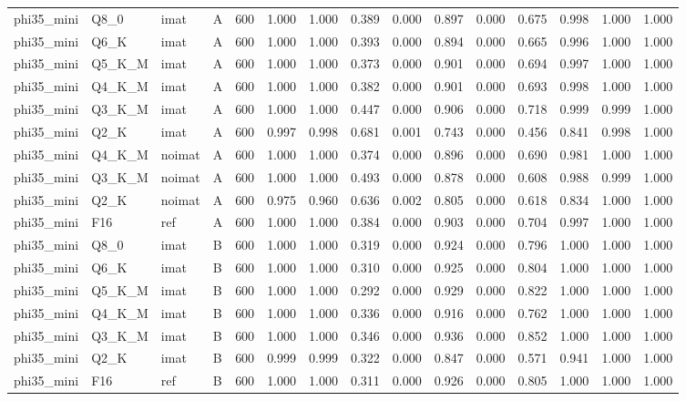 \begin{tabular}{llllrrrrrrrrrrr}
phi35\_mini & Q8\_0 & imat & A & 600 & 1.000 & 1.000 & 0.389 & 0.000 & 0.897 & 0.000 & 0.675 & 0.998 & 1.000 & 1.000 \\
phi35\_mini & Q6\_K & imat & A & 600 & 1.000 & 1.000 & 0.393 & 0.000 & 0.894 & 0.000 & 0.665 & 0.996 & 1.000 & 1.000 \\
phi35\_mini & Q5\_K\_M & imat & A & 600 & 1.000 & 1.000 & 0.373 & 0.000 & 0.901 & 0.000 & 0.694 & 0.997 & 1.000 & 1.000 \\
phi35\_mini & Q4\_K\_M & imat & A & 600 & 1.000 & 1.000 & 0.382 & 0.000 & 0.901 & 0.000 & 0.693 & 0.998 & 1.000 & 1.000 \\
phi35\_mini & Q3\_K\_M & imat & A & 600 & 1.000 & 1.000 & 0.447 & 0.000 & 0.906 & 0.000 & 0.718 & 0.999 & 0.999 & 1.000 \\
phi35\_mini & Q2\_K & imat & A & 600 & 0.997 & 0.998 & 0.681 & 0.001 & 0.743 & 0.000 & 0.456 & 0.841 & 0.998 & 1.000 \\
phi35\_mini & Q4\_K\_M & noimat & A & 600 & 1.000 & 1.000 & 0.374 & 0.000 & 0.896 & 0.000 & 0.690 & 0.981 & 1.000 & 1.000 \\
phi35\_mini & Q3\_K\_M & noimat & A & 600 & 1.000 & 1.000 & 0.493 & 0.000 & 0.878 & 0.000 & 0.608 & 0.988 & 0.999 & 1.000 \\
phi35\_mini & Q2\_K & noimat & A & 600 & 0.975 & 0.960 & 0.636 & 0.002 & 0.805 & 0.000 & 0.618 & 0.834 & 1.000 & 1.000 \\
phi35\_mini & F16 & ref & A & 600 & 1.000 & 1.000 & 0.384 & 0.000 & 0.903 & 0.000 & 0.704 & 0.997 & 1.000 & 1.000 \\
phi35\_mini & Q8\_0 & imat & B & 600 & 1.000 & 1.000 & 0.319 & 0.000 & 0.924 & 0.000 & 0.796 & 1.000 & 1.000 & 1.000 \\
phi35\_mini & Q6\_K & imat & B & 600 & 1.000 & 1.000 & 0.310 & 0.000 & 0.925 & 0.000 & 0.804 & 1.000 & 1.000 & 1.000 \\
phi35\_mini & Q5\_K\_M & imat & B & 600 & 1.000 & 1.000 & 0.292 & 0.000 & 0.929 & 0.000 & 0.822 & 1.000 & 1.000 & 1.000 \\
phi35\_mini & Q4\_K\_M & imat & B & 600 & 1.000 & 1.000 & 0.336 & 0.000 & 0.916 & 0.000 & 0.762 & 1.000 & 1.000 & 1.000 \\
phi35\_mini & Q3\_K\_M & imat & B & 600 & 1.000 & 1.000 & 0.346 & 0.000 & 0.936 & 0.000 & 0.852 & 1.000 & 1.000 & 1.000 \\
phi35\_mini & Q2\_K & imat & B & 600 & 0.999 & 0.999 & 0.322 & 0.000 & 0.847 & 0.000 & 0.571 & 0.941 & 1.000 & 1.000 \\
phi35\_mini & F16 & ref & B & 600 & 1.000 & 1.000 & 0.311 & 0.000 & 0.926 & 0.000 & 0.805 & 1.000 & 1.000 & 1.000 \\

\end{tabular}
